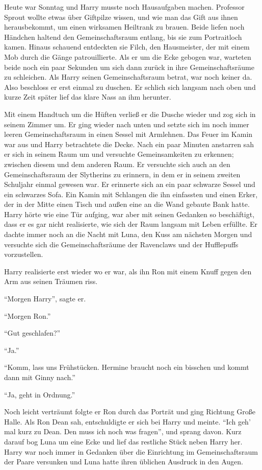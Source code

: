 Heute war Sonntag und Harry musste noch Hausaufgaben machen. Professor Sprout wollte etwas über Giftpilze wissen, und wie man das Gift aus ihnen herausbekommt, um einen wirksamen Heiltrank zu brauen. Beide liefen noch Händchen haltend den Gemeinschaftsraum entlang, bis sie zum Portraitloch kamen. Hinaus schauend entdeckten sie Filch, den Hausmeister, der mit einem Mob durch die Gänge patrouillierte. Als er um die Ecke gebogen war, warteten beide noch ein paar Sekunden um sich dann zurück in ihre Gemeinschaftsräume zu schleichen. Als Harry seinen Gemeinschaftsraum betrat, war noch keiner da. Also beschloss er erst einmal zu duschen. Er schlich sich langsam nach oben und kurze Zeit später lief das klare Nass an ihm herunter.

Mit einem Handtuch um die Hüften verließ er die Dusche wieder und zog sich in seinem Zimmer um. Er ging wieder nach unten und setzte sich im noch immer leeren Gemeinschaftsraum in einen Sessel mit Armlehnen. Das Feuer im Kamin war aus und Harry betrachtete die Decke. Nach ein paar Minuten anstarren sah er sich in seinem Raum um und versuchte Gemeinsamkeiten zu erkennen; zwischen diesem und dem anderen Raum. Er versuchte sich auch an den Gemeinschaftsraum der Slytherins zu erinnern, in dem er in seinem zweiten Schuljahr einmal gewesen war. Er erinnerte sich an ein paar schwarze Sessel und ein schwarzes Sofa. Ein Kamin mit Schlangen die ihn einfassten und einen Erker, der in der Mitte einen Tisch und außen eine an die Wand gebaute Bank hatte. Harry hörte wie eine Tür aufging, war aber mit seinen Gedanken so beschäftigt, dass er es gar nicht realisierte, wie sich der Raum langsam mit Leben erfüllte. Er dachte immer noch an die Nacht mit Luna, den Kuss am nächsten Morgen und versuchte sich die Gemeinschaftsräume der Ravenclaws und der Hufflepuffs vorzustellen.

Harry realisierte erst wieder wo er war, als ihn Ron mit einem Knuff gegen den Arm aus seinen Träumen riss.

\enquote{Morgen Harry}, sagte er.

\enquote{Morgen Ron.}

\enquote{Gut geschlafen?}

\enquote{Ja.}

\enquote{Komm, lass uns Frühstücken. Hermine braucht noch ein bisschen und kommt dann mit Ginny nach.}

\enquote{Ja, geht in Ordnung.}

Noch leicht verträumt folgte er Ron durch das Porträt und ging Richtung Große Halle. Als Ron Dean sah, entschuldigte er sich bei Harry und meinte. \enquote{Ich geh' mal kurz zu Dean. Den muss ich noch was fragen}, und sprang davon. Kurz darauf bog Luna um eine Ecke und lief das restliche Stück neben Harry her. Harry war noch immer in Gedanken über die Einrichtung im Gemeinschaftsraum der Paare versunken und Luna hatte ihren üblichen Ausdruck in den Augen.

